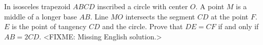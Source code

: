 \problem
In isosceles trapezoid $ABCD$ inscribed a circle with center $O$.
A point $M$ is a middle of a longer base $AB$.
Line $MO$ intersects the segment $CD$ at the point $F$.
$E$ is the point of tangency $CD$ and the circle.
Prove that $DE = CF$ if and only if $AB = 2 CD$.
\solution
<FIXME: Missing English solution.>
\endproblem
